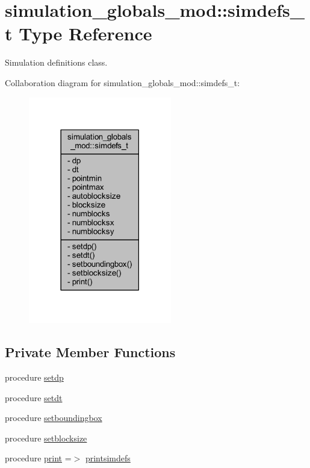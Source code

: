 \hypertarget{structsimulation__globals__mod_1_1simdefs__t}{}\section{simulation\+\_\+globals\+\_\+mod\+:\+:simdefs\+\_\+t Type Reference}
\label{structsimulation__globals__mod_1_1simdefs__t}


Simulation definitions class.  




Collaboration diagram for simulation\+\_\+globals\+\_\+mod\+:\+:simdefs\+\_\+t\+:
\nopagebreak
\begin{figure}[H]
\begin{center}
\leavevmode
\includegraphics[width=177pt]{structsimulation__globals__mod_1_1simdefs__t__coll__graph}
\end{center}
\end{figure}
\subsection*{Private Member Functions}
\begin{DoxyCompactItemize}
\item 
procedure \mbox{\hyperlink{structsimulation__globals__mod_1_1simdefs__t_afca736d60d830235b7f84139eb5a1c0e}{setdp}}
\item 
procedure \mbox{\hyperlink{structsimulation__globals__mod_1_1simdefs__t_a80238515dc8566871b44ec89ee9fe1e7}{setdt}}
\item 
procedure \mbox{\hyperlink{structsimulation__globals__mod_1_1simdefs__t_a1f16ff24bfef17406b0d0ffe1d5bcce8}{setboundingbox}}
\item 
procedure \mbox{\hyperlink{structsimulation__globals__mod_1_1simdefs__t_ae55e67ff6ecd7045526f099a4bb77fac}{setblocksize}}
\item 
procedure \mbox{\hyperlink{structsimulation__globals__mod_1_1simdefs__t_a135110b50bcbd621d80df8f7b31fa60e}{print}} =$>$ \mbox{\hyperlink{namespacesimulation__globals__mod_ad331ccf019de7ed531e37c655600f90f}{printsimdefs}}
\end{DoxyCompactItemize}
